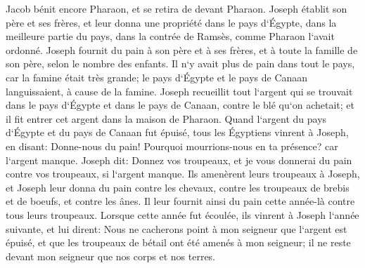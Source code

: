 \verse Jacob bénit encore Pharaon, et se retira de devant Pharaon. 
\verse Joseph établit son père et ses frères, et leur donna une propriété dans le pays d`Égypte, dans la meilleure partie du pays, dans la contrée de Ramsès, comme Pharaon l`avait ordonné. 
\verse Joseph fournit du pain à son père et à ses frères, et à toute la famille de son père, selon le nombre des enfants. 
\verse Il n`y avait plus de pain dans tout le pays, car la famine était très grande; le pays d`Égypte et le pays de Canaan languissaient, à cause de la famine. 
\verse Joseph recueillit tout l`argent qui se trouvait dans le pays d`Égypte et dans le pays de Canaan, contre le blé qu`on achetait; et il fit entrer cet argent dans la maison de Pharaon. 
\verse Quand l`argent du pays d`Égypte et du pays de Canaan fut épuisé, tous les Égyptiens vinrent à Joseph, en disant: Donne-nous du pain! Pourquoi mourrions-nous en ta présence? car l`argent manque. 
\verse Joseph dit: Donnez vos troupeaux, et je vous donnerai du pain contre vos troupeaux, si l`argent manque. 
\verse Ils amenèrent leurs troupeaux à Joseph, et Joseph leur donna du pain contre les chevaux, contre les troupeaux de brebis et de boeufs, et contre les ânes. Il leur fournit ainsi du pain cette année-là contre tous leurs troupeaux. 
\verse Lorsque cette année fut écoulée, ils vinrent à Joseph l`année suivante, et lui dirent: Nous ne cacherons point à mon seigneur que l`argent est épuisé, et que les troupeaux de bétail ont été amenés à mon seigneur; il ne reste devant mon seigneur que nos corps et nos terres. 

